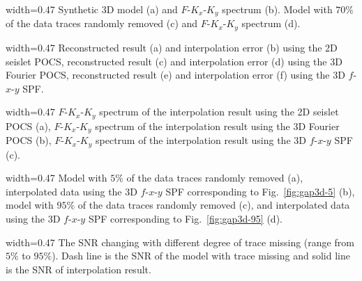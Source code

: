  {width=0.47\columnwidth}
{Synthetic 3D model (a) and $F$-$K_{x}$-$K_{y}$ spectrum (b).  Model
  with $70\%$ of the data traces randomly removed (c) and
  $F$-$K_{x}$-$K_{y}$ spectrum (d).}

{width=0.47\columnwidth} {Reconstructed result (a) and interpolation
  error (b) using the 2D seislet POCS, reconstructed result (c) and
  interpolation error (d) using the 3D Fourier POCS, reconstructed
  result (e) and interpolation error (f) using the 3D $f$-$x$-$y$
  SPF.}

 {width=0.47\columnwidth}
{$F$-$K_{x}$-$K_{y}$ spectrum of the interpolation result using the 2D
  seislet POCS (a), $F$-$K_{x}$-$K_{y}$ spectrum of the interpolation
  result using the 3D Fourier POCS (b), $F$-$K_{x}$-$K_{y}$ spectrum
  of the interpolation result using the 3D $f$-$x$-$y$ SPF (c).}

{width=0.47\columnwidth} {Model with $5\%$ of the data traces randomly
  removed (a), interpolated data using the 3D $f$-$x$-$y$ SPF
  corresponding to Fig.~\ref{fig:gap3d-5} (b), model with $95\%$ of
  the data traces randomly removed (c), and interpolated data using
  the 3D $f$-$x$-$y$ SPF corresponding to Fig.~\ref{fig:gap3d-95}
  (d).}

 {width=0.47\columnwidth} {The SNR changing with different
  degree of trace missing (range from $5\%$ to $95\%$). Dash line is
  the SNR of the model with trace missing and solid line is the SNR of
  interpolation result.}

